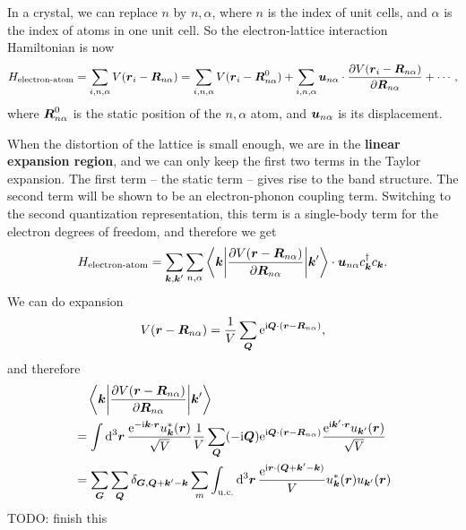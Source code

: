\documentclass[hyperref, a4paper]{article}
\newcommand*{\ii}{\mathrm{i}}
\newcommand*{\ee}{\mathrm{e}}
\newcommand*{\concept}[1]{{\textbf{#1}}}
\begin{document}
In a crystal, we can replace $n$ by $n, \alpha$, 
where $n$ is the index of unit cells, 
and $\alpha$ is the index of atoms in one unit cell.
So the electron-lattice interaction Hamiltonian is now 
\begin{equation}
    H_{\text{electron-atom}} = \sum_{i, n, \alpha} V(\vb*{r}_i - \vb*{R}_{n \alpha})
    = \sum_{i, n, \alpha} V(\vb*{r}_i - \vb*{R}_{n \alpha}^0)
    + \sum_{i, n, \alpha} \vb*{u}_{n \alpha} \cdot \pdv{V(\vb*{r}_i - \vb*{R}_{n \alpha})}{\vb*{R}_{n \alpha}}
    + \cdots,
\end{equation}
where $\vb*{R}^0_{n \alpha}$ is the static position of the $n, \alpha$ atom, 
and $\vb*{u}_{n \alpha}$ is its displacement.

When the distortion of the lattice is small enough, 
we are in the \concept{linear expansion region}, 
and we can only keep the first two terms in the Taylor expansion.
The first term -- the static term -- 
gives rise to the band structure. 
The second term will be shown to be an electron-phonon coupling term.
Switching to the second quantization representation, 
this term is a single-body term for the electron degrees of freedom, 
and therefore we get 
\begin{equation}
    H_{\text{electron-atom}} = 
    \sum_{\vb*{k}, \vb*{k}'} \sum_{n, \alpha}
    \mel**{\vb*{k}}{\pdv{V(\vb*{r} - \vb*{R}_{n \alpha})}{\vb*{R}_{n \alpha}}}{\vb*{k}'} 
    \cdot \vb*{u}_{n \alpha} c^\dagger_{\vb*{k}} c_{\vb*{k}}.
\end{equation}
We can do expansion 
\begin{equation}
    V(\vb*{r} - \vb*{R}_{n \alpha}) 
    = \frac{1}{V} \sum_{\vb*{Q}} \ee^{\ii \vb*{Q} \cdot (\vb*{r} - \vb*{R}_{n \alpha})},
\end{equation}
and therefore 
\[
    \begin{aligned}
        &\quad \mel**{\vb*{k}}{\pdv{V(\vb*{r} - \vb*{R}_{n \alpha})}{\vb*{R}_{n \alpha}}}{\vb*{k}'} \\
        &= 
        \int\dd[3]{\vb*{r}} \frac{\ee^{- \ii \vb*{k} \cdot \vb*{r}} u^*_{\vb*{k}}(\vb*{r})}{\sqrt{V}} 
        \frac{1}{V} \sum_{\vb*{Q}}  (- \ii \vb*{Q} ) \ee^{\ii \vb*{Q} \cdot (\vb*{r} - \vb*{R}_{n \alpha})}
        \frac{\ee^{\ii \vb*{k}' \cdot \vb*{r}} u_{\vb*{k}'}(\vb*{r})}{\sqrt{V}} \\
        &= \sum_{\vb*{G}} \sum_{\vb*{Q}} \delta_{\vb*{G}, \vb*{Q} + \vb*{k}' - \vb*{k}}
        \sum_m \int_{\text{u.c.}} \dd[3]{\vb*{r}} 
        \frac{\ee^{\ii \vb*{r} \cdot (\vb*{Q} + \vb*{k}' - \vb*{k})}}{V} 
        u_{\vb*{k}}^* (\vb*{r}) u_{\vb*{k}'}(\vb*{r}) 
    \end{aligned}
\]
TODO: finish this 
\end{document}
